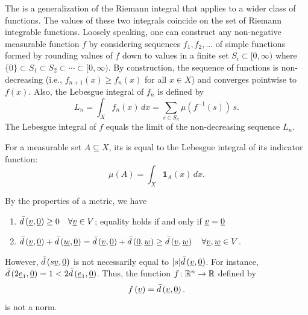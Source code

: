 \begin{example}
\begin{table}[p]
{\begin{minipage}[t]{\textwidth}
\begin{definition}
The  is a generalization of the Riemann integral that applies to a wider class of functions.
The values of these two integrals coincide on the set of Riemann integrable functions.
Loosely speaking, one can construct any non-negative measurable function $f$ by considering sequences $f_{1},f_{2},\ldots$ of simple functions formed by rounding values of $f$ down to values in a finite set $S_i \subset [0,\infty)$ where $\{0\} \subset S_1 \subset S_2 \subset \cdots \subset [0,\infty)$.
By construction, the sequence of functions is non-decreasing (i.e., $f_{n+1}(x)\geq f_{n}(x)$ for all $x\in X$) and converges pointwise to $f(x)$.
Also, the Lebesgue integral of $f_n$ is defined by
\[ L_n = \int_X f_n (x) \, dx = \sum_{s\in S_n} \mu(f^{-1}(s))\, s. \]
The Lebesgue integral of $f$ equals the limit of the non-decreasing sequence $L_n$.
\end{definition}

For a measurable set $A\subseteq X$, its  is equal to the Lebesgue integral of its indicator function:
\[
\mu(A)=\int_X\mathbf 1_A(x)\,dx.
\]
\end{minipage}}
\end{table}

By the properties of a metric, we have
\begin{enumerate}
\item $\bar{d} \left( \underline{v}, \underline{0} \right) \geq 0 \quad \forall \underline{v} \in V$; equality holds if and only if $\underline{v} = \underline{0}$
\item $\bar{d} \left( \underline{v}, \underline{0} \right) + \bar{d} \left( \underline{w}, \underline{0} \right) = \bar{d} \left( \underline{v}, \underline{0} \right) + \bar{d} \left( \underline{0}, \underline{w} \right) \geq \bar{d} \left( \underline{v}, \underline{w} \right) \quad \forall \underline{v}, \underline{w} \in V$.
\end{enumerate}
However, $\bar{d} \left( s \underline{v}, \underline{0} \right)$ is not necessarily equal to $|s| \bar{d} \left( \underline{v}, \underline{0} \right)$.
For instance,
$\bar{d} \left( 2 \underline{e}_1, \underline{0} \right) = 1 < 2 \bar{d} \left( \underline{e}_1, \underline{0} \right)$.
Thus, the function $f \colon \mathbb{R}^n \rightarrow \mathbb{R}$ defined by
\begin{equation*}
f \left( \underline{v} \right) = \bar{d} \left( \underline{v}, \underline{0} \right).
\end{equation*}
is not a norm.
\end{example}

